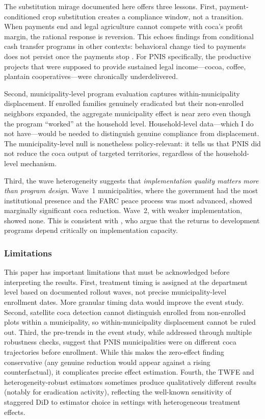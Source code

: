 \documentclass[12pt]{article}
\begin{document}
The substitution mirage documented here offers three lessons. First, payment-conditioned crop substitution creates a compliance window, not a transition. When payments end and legal agriculture cannot compete with coca's profit margin, the rational response is reversion. This echoes findings from conditional cash transfer programs in other contexts: behavioral change tied to payments does not persist once the payments stop \citep{baird2019}. For PNIS specifically, the productive projects that were supposed to provide sustained legal income---cocoa, coffee, plantain cooperatives---were chronically underdelivered.

Second, municipality-level program evaluation captures within-municipality displacement. If enrolled families genuinely eradicated but their non-enrolled neighbors expanded, the aggregate municipality effect is near zero even though the program ``worked'' at the household level. Household-level data---which I do not have---would be needed to distinguish genuine compliance from displacement. The municipality-level null is nonetheless policy-relevant: it tells us that PNIS did not reduce the coca output of targeted territories, regardless of the household-level mechanism.

Third, the wave heterogeneity suggests that \emph{implementation quality matters more than program design}. Wave~1 municipalities, where the government had the most institutional presence and the FARC peace process was most advanced, showed marginally significant coca reduction. Wave~2, with weaker implementation, showed none. This is consistent with \citet{banerjee2017}, who argue that the returns to development programs depend critically on implementation capacity.

\subsubsection*{Limitations} This paper has important limitations that must be acknowledged before interpreting the results. First, treatment timing is assigned at the department level based on documented rollout waves, not precise municipality-level enrollment dates. More granular timing data would improve the event study. Second, satellite coca detection cannot distinguish enrolled from non-enrolled plots within a municipality, so within-municipality displacement cannot be ruled out. Third, the pre-trends in the event study, while addressed through multiple robustness checks, suggest that PNIS municipalities were on different coca trajectories before enrollment. While this makes the zero-effect finding conservative (any genuine reduction would appear against a rising counterfactual), it complicates precise effect estimation. Fourth, the TWFE and heterogeneity-robust estimators sometimes produce qualitatively different results (notably for eradication activity), reflecting the well-known sensitivity of staggered DiD to estimator choice in settings with heterogeneous treatment effects.
\end{document}

